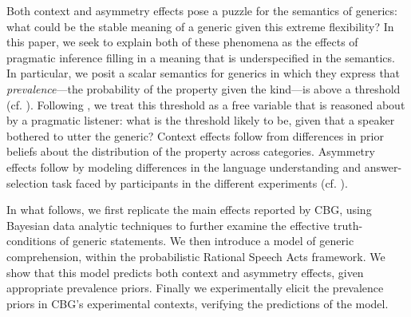\documentclass[10pt,letterpaper]{article}
\begin{document}
Both context and asymmetry effects pose a puzzle for the semantics of generics: what could be the stable meaning of a generic given this extreme flexibility? 
In this paper, we seek to explain both of these phenomena as the effects of pragmatic inference filling in a meaning that is underspecified in the semantics. 
In particular, we posit a scalar semantics for generics in which they express that \emph{prevalence}---the probability of the property given the kind---is above a threshold (cf. ). Following , we treat this threshold as a free variable that is reasoned about by a pragmatic listener: what is the threshold likely to be, given that a speaker bothered to utter the generic? Context effects follow from differences in prior beliefs about the distribution of the property across categories. Asymmetry effects follow by modeling differences in the language understanding and answer-selection task faced by participants in the different experiments (cf. ).  %


In what follows, we first replicate the main effects reported by CBG, using Bayesian data analytic techniques to further examine the effective truth-conditions of generic statements. We then introduce a model of generic comprehension, within the probabilistic Rational Speech Acts framework. We show that this model predicts both context and asymmetry effects, given appropriate prevalence priors. Finally we experimentally elicit the prevalence priors in CBG's experimental contexts, verifying the predictions of the model.



\end{document}
